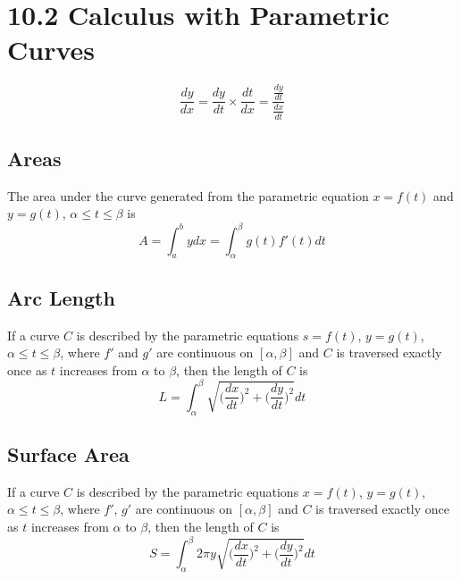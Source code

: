 %
%

\section*{10.2 Calculus with Parametric Curves}

\[ \frac{dy}{dx} = \frac{dy}{dt} \times \frac{dt}{dx} = \frac{\frac{dy}{dt}}{\frac{dx}{dt}} \]

\subsection*{Areas}

The area under the curve generated from the parametric equation \(x=f(t)\) and \(y=g(t)\), \(\alpha \leq t \leq \beta\) is
\[ A = \int_a^b{ydx} = \int_{\alpha}^{\beta}{g(t)f'(t)dt} \]

\subsection*{Arc Length}

If a curve \(C\) is described by the parametric equations \(s = f(t)\), \(y=g(t)\), \(\alpha \leq t \leq \beta\), where \(f'\) and \(g'\) are continuous on \([ \alpha, \beta]\) and \(C\) is traversed exactly once as \(t\) increases from \(\alpha\) to \(\beta\), then the length of \(C\) is
\[ L = \int_{\alpha}^{\beta}{\sqrt{\bigg(\frac{dx}{dt}\bigg)^2 + \bigg(\frac{dy}{dt} \bigg)^2}dt} \]

\subsection*{Surface Area}

If a curve \(C\) is described by the parametric equations \(x=f(t)\), \(y=g(t)\), \(\alpha \leq t \leq \beta\), where \(f'\), \(g'\) are continuous on \([\alpha, \beta]\) and \(C\) is traversed exactly once as \(t\) increases from \(\alpha\) to \(\beta\), then the length of \(C\) is
\[ S = \int_{\alpha}^{\beta}{2 \pi y \sqrt{\bigg( \frac{dx}{dt} \bigg)^2 + \bigg( \frac{dy}{dt} \bigg)^2}dt}\]
